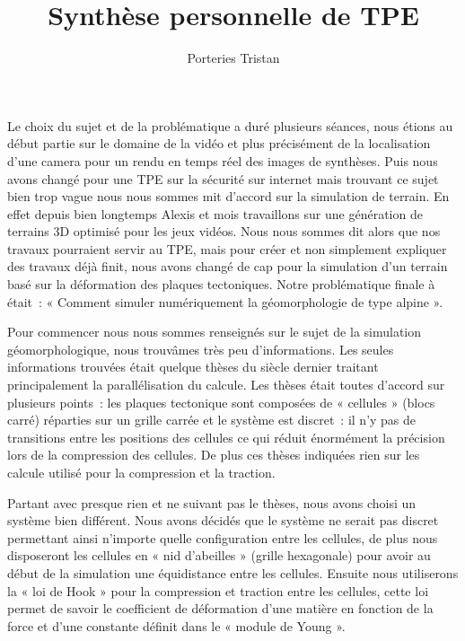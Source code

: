 \documentclass[a4paper,10pt]{article}
\title{Synthèse personnelle de TPE}
\author{Porteries Tristan}
\begin{document}
\maketitle

\begin{abstract}

\end{abstract}

Le choix du sujet et de la problématique a duré plusieurs séances, nous étions au début partie sur le domaine de la vidéo et plus précisément de la localisation d'une camera pour un rendu en temps réel des images de synthèses.
Puis nous avons changé pour une TPE sur la sécurité sur internet mais trouvant ce sujet bien trop vague nous nous sommes mit d'accord sur la simulation de terrain.
En effet depuis bien longtemps Alexis et mois travaillons sur une génération de terrains 3D optimisé pour les jeux vidéos.
Nous nous sommes dit alors que nos travaux pourraient servir au TPE, mais pour créer et non simplement expliquer des travaux déjà finit, nous avons changé de cap pour la simulation d'un terrain basé sur la déformation des plaques tectoniques.
Notre problématique finale à était~: « Comment simuler numériquement la géomorphologie de type alpine ».

Pour commencer nous nous sommes renseignés sur le sujet de la simulation géomorphologique, nous trouvâmes très peu d'informations.
Les seules informations trouvées était quelque thèses du siècle dernier traitant principalement la parallélisation du calcule.
Les thèses était toutes d'accord sur plusieurs points~: les plaques tectonique sont composées de « cellules » (blocs carré) réparties sur un grille carrée et le système est discret~: il n'y pas de transitions entre les positions des cellules ce qui réduit énormément la précision lors de la compression des cellules.
De plus ces thèses indiquées rien sur les calcule utilisé pour la compression et la traction.

Partant avec presque rien et ne suivant pas le thèses, nous avons choisi un système bien différent.
Nous avons décidés que le système ne serait pas discret permettant ainsi n'importe quelle configuration entre les cellules, de plus nous disposeront les cellules en « nid d'abeilles » (grille hexagonale) pour avoir au début de la simulation une équidistance entre les cellules.
Ensuite nous utiliserons la « loi de Hook » pour la compression et traction entre les cellules, cette loi permet de savoir le coefficient de déformation d'une matière en fonction de la force et d'une constante définit dans le « module de Young ».
\end{document}
